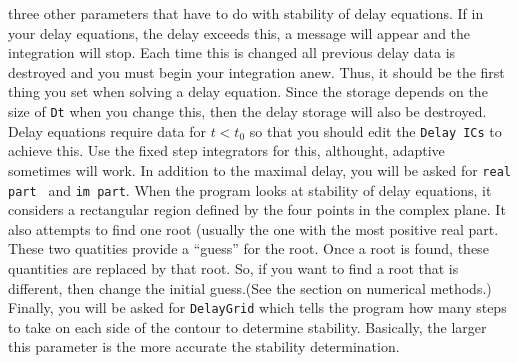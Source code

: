 \documentclass{article}
\begin{document}
\begin{description}
three other parameters that have to do with stability of delay
equations.
 If in your delay
 equations, the delay exceeds this, a message will appear and the integration 
will stop.  Each time this is changed all previous delay data is destroyed and
 you must begin your integration anew.  Thus, it should be the first thing you
 set when solving a delay equation.  Since the storage depends on the size of
 {\tt Dt} when you change this, then the delay storage will also be
destroyed.  Delay equations require data for $t<t_0$ so that you
should edit the {\tt Delay ICs} to achieve this.  Use the fixed step
integrators for this, althought, adaptive sometimes will work.
  In addition to the maximal delay,
you will be asked for {\tt real part } and {\tt im part}.  When the
program looks at stability of delay equations, it considers a
rectangular region defined by the four points in the complex plane.
It also attempts to find one root (usually the one with the most positive
real part. These two quatities provide a ``guess'' for the root. 
Once a root is found, these quantities are replaced by that root. So,
if you want to find a root that is different, then change the initial
guess.(See the section
on numerical methods.) Finally, you will be asked for {\tt DelayGrid}
which tells the program how many steps to take on each side of the
contour to determine stability.  Basically, the larger this
parameter is the more accurate the stability determination.


\end{description}
\end{document}

